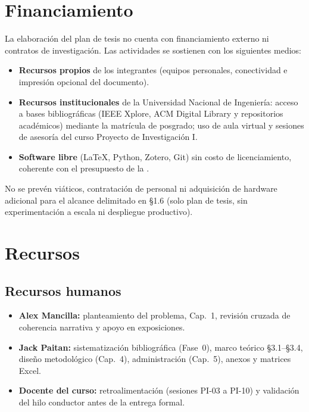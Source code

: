 \section{Financiamiento}

La elaboración del plan de tesis no cuenta con financiamiento externo ni contratos de investigación.
Las actividades se sostienen con los siguientes medios:

\begin{itemize}
  \item \textbf{Recursos propios} de los integrantes (equipos personales, conectividad e impresión
        opcional del documento).
  \item \textbf{Recursos institucionales} de la Universidad Nacional de Ingeniería: acceso a bases
        bibliográficas (IEEE Xplore, ACM Digital Library y repositorios académicos) mediante la
        matrícula de posgrado; uso de aula virtual y sesiones de asesoría del curso Proyecto de
        Investigación I.
  \item \textbf{Software libre} (\LaTeX{}, Python, Zotero, Git) sin costo de licenciamiento,
        coherente con el presupuesto de la .
\end{itemize}

No se prevén viáticos, contratación de personal ni adquisición de hardware adicional para el alcance
delimitado en §1.6 (solo plan de tesis, sin experimentación a escala ni despliegue productivo).

\section{Recursos}

\subsection{Recursos humanos}

\begin{itemize}
  \item \textbf{Alex Mancilla:} planteamiento del problema, Cap.~1, revisión cruzada de coherencia
        narrativa y apoyo en exposiciones.
  \item \textbf{Jack Paitan:} sistematización bibliográfica (Fase~0), marco teórico §3.1--§3.4,
        diseño metodológico (Cap.~4), administración (Cap.~5), anexos y matrices Excel.
  \item \textbf{Docente del curso:} retroalimentación (sesiones PI-03 a PI-10) y validación del
        hilo conductor antes de la entrega formal.
\end{itemize}

